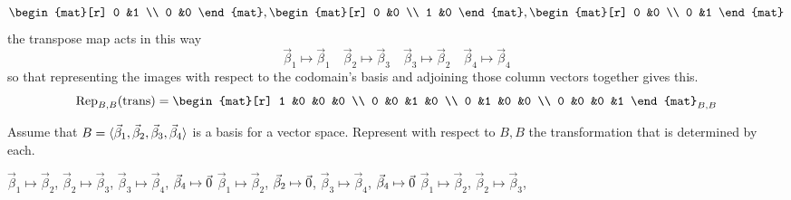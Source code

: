 \begin{exercises}
\begin{answer}
\begin{equation*}
{            \begin{mat}[r]
              0  &1  \\
              0  &0
            \end{mat},
            \begin{mat}[r]
              0  &0  \\
              1  &0
            \end{mat},
            \begin{mat}[r]
              0  &0  \\
              0  &1
            \end{mat}   }
      \end{equation*}
      the transpose map acts in this way
      \begin{equation*}
        \vec{\beta}_1\mapsto\vec{\beta}_1 
        \quad \vec{\beta}_2\mapsto\vec{\beta}_3 
        \quad \vec{\beta}_3\mapsto\vec{\beta}_2 
        \quad \vec{\beta}_4\mapsto\vec{\beta}_4  
      \end{equation*}
      so that representing the images with respect to the codomain's
      basis and adjoining those column vectors together gives this.
      \begin{equation*}
        \rep{\text{trans}}{B,B}=
        \begin{mat}[r]
          1  &0  &0  &0  \\
          0  &0  &1  &0  \\
          0  &1  &0  &0  \\
          0  &0  &0  &1
        \end{mat}_{B,B}
      \end{equation*}   
     \end{answer}
  \item 
     Assume that 
     \( B=\langle\vec{\beta}_1,\vec{\beta}_2,\vec{\beta}_3,\vec{\beta}_4\rangle \)
     is a basis for a vector space.
     Represent with respect to \( B,B \) the transformation that is determined
     by each.
     \begin{exparts}
       \partsitem \( \vec{\beta}_1\mapsto\vec{\beta}_2 \),
         \( \vec{\beta}_2\mapsto\vec{\beta}_3 \),
         \( \vec{\beta}_3\mapsto\vec{\beta}_4 \),
         \( \vec{\beta}_4\mapsto\vec{0} \)
       \partsitem \( \vec{\beta}_1\mapsto\vec{\beta}_2 \),
         \( \vec{\beta}_2\mapsto\vec{0} \),
         \( \vec{\beta}_3\mapsto\vec{\beta}_4 \),
         \( \vec{\beta}_4\mapsto\vec{0} \)
       \partsitem \( \vec{\beta}_1\mapsto\vec{\beta}_2 \),
         \( \vec{\beta}_2\mapsto\vec{\beta}_3 \),

\end{exparts}
\end{exercises}
